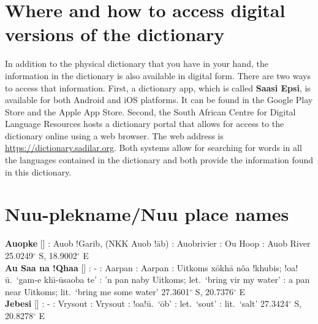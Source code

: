 \markboth{}{}
\addtocounter{section}{-1}
\tocless\section{Where and how to access digital versions of the dictionary}
{}
\markboth{}{}

In addition to the physical dictionary that you have in your hand, the
information in the dictionary is also available in digital form. There
are two ways to access that information. First, a dictionary app,
which is called \textbf{Saasi Epsi}, is available for both Android and
iOS platforms. It can be found in the Google Play Store and the Apple
App Store. Second, the South African Centre for Digital Language
Resources hosts a dictionary portal that allows for access to the
dictionary online using a web browser. The web address is
\url{https://dictionary.sadilar.org}. Both systems allow for searching
for words in all the languages contained in the dictionary and both
provide the information found in this dictionary.

\newpage


\markboth{}{}
\section{N\textvertline{}uu-plekname/N\textvertline{}uu place names}
\label{s:placenames}
\markboth{}{}

\textbf{Auopke} [] : Auob !Garib, (NKK
Auob !\={a}b) : Auobrivier
: Ou Hoop :
Auob River 25.0249$^{\circ}$ S, 18.9002$^{\circ}$ E \\

\textbf{Au Saa na !Qhaa} [] :
- : Aarpan : Aarpan :
Uitkoms x\={o}\textvertline{}kh\={a} \textdoublebarpipe{}n\^{o}a
!khubis; !oa!\={u}.\ `\textdoublevertline{}gam-e
\textvertline{}kh\={\i}-\={u}saoba te' : 'n pan naby
Uitkoms; let.\ `bring vir my water' : a pan near
Uitkoms; lit.\ `bring me some water' 27.3601$^{\circ}$ S,
20.7376$^{\circ}$ E \\

\textbf{Jebesi} [] : -
: Vrysout : Vrysout :
!oa!\={u}.\ `\textdoublebarpipe{}\={o}b' : let.\ `sout'
: lit.\ `salt' 27.3424$^{\circ}$ S, 20.8278$^{\circ}$ E
\\


